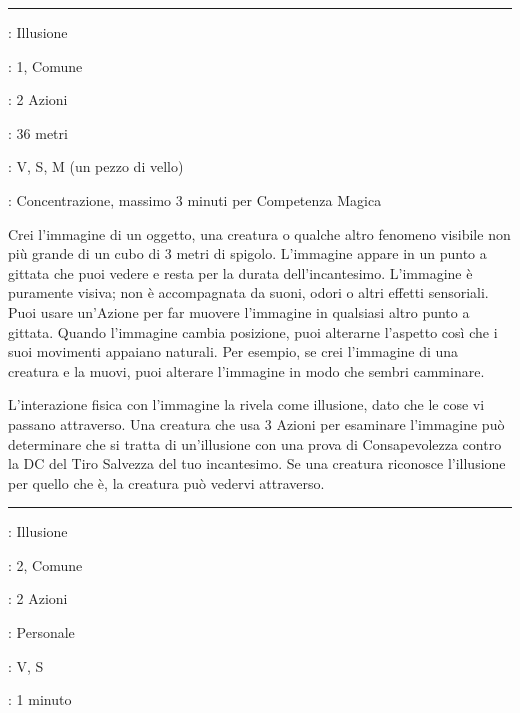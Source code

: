 \begin{multicols}{2}
\smallskip\noindent\rule{\linewidth}{2pt} \hypertarget{Immagine Silenziosa}{}\medskip{}
\noindent
\begin{description}[noitemsep, topsep=0pt, parsep=0pt, partopsep=0pt, leftmargin=0cm, labelwidth=2.8cm]
	\item[\textbf{Lista di Magia}]: Illusione
	\item[\textbf{Livello}]: 1, Comune
	\item[\textbf{T. di Lancio}]: 2 Azioni
	\item[\textbf{Gittata}]: 36 metri
	\item[\textbf{Componenti}]: V, S, M (un pezzo di vello)
	\item[\textbf{Durata}]: Concentrazione, massimo 3 minuti per Competenza Magica
\end{description}

Crei l'immagine di un oggetto, una creatura o qualche altro fenomeno visibile non più grande di un cubo di 3 metri di spigolo. L'immagine appare in un punto a gittata che puoi vedere e resta per la durata dell'incantesimo. L'immagine è puramente visiva; non è accompagnata da suoni, odori o altri effetti sensoriali. Puoi usare un'Azione per far muovere l'immagine in qualsiasi altro punto a gittata. Quando l'immagine cambia posizione, puoi alterarne l'aspetto così che i suoi movimenti appaiano naturali. Per esempio, se crei l'immagine di una creatura e la muovi, puoi alterare l'immagine in modo che sembri camminare.

L'interazione fisica con l'immagine la rivela come illusione, dato che le cose vi passano attraverso. Una creatura che usa 3 Azioni per esaminare l'immagine può determinare che si tratta di un'illusione con una prova di Consapevolezza contro la DC del Tiro Salvezza del tuo incantesimo. Se una creatura riconosce l'illusione per quello che è, la creatura può vedervi attraverso.

\smallskip\noindent\rule{\linewidth}{2pt} \hypertarget{Immagine Speculare}{}\medskip{}
\noindent
\begin{description}[noitemsep, topsep=0pt, parsep=0pt, partopsep=0pt, leftmargin=0cm, labelwidth=2.8cm]
	\item[\textbf{Lista di Magia}]: Illusione
	\item[\textbf{Livello}]: 2, Comune
	\item[\textbf{T. di Lancio}]: 2 Azioni
	\item[\textbf{Gittata}]: Personale
	\item[\textbf{Componenti}]: V, S
	\item[\textbf{Durata}]: 1 minuto
\end{description}


\end{multicols}
